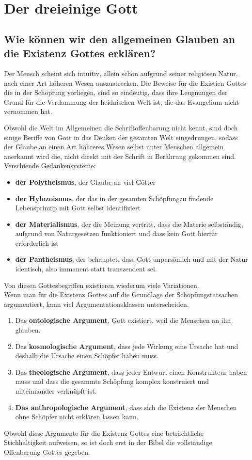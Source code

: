 \section{Der dreieinige Gott}
\subsection{Wie können wir den allgemeinen Glauben an die Existenz Gottes erklären?}
Der Mensch scheint sich intuitiv, allein schon aufgrund seiner religiösen Natur, nach einer Art höheren Wesen auszustrecken. Die Beweise für die Existien Gottes die in der Schöpfung vorliegen, sind so eindeutig, dass ihre Leugnungen der Grund für die Verdammung der heidnischen Welt ist, die das Evangelium nicht vernommen hat.

Obwohl die Welt im Allgemeinen die Schriftoffenbarung nicht kennt, sind doch einige Beriffe von Gott in das Denken der gesamten Welt eingedrungen, sodass der Glaube an einen Art höhreres Wesen selbst unter Menschen allgemein anerkannt wird die, nicht direkt mit der Schrift in Berährung gekommen sind.\\
Verschiende Gedankensysteme:
\begin{itemize}
	\item \textbf{der Polytheismus}, der Glaube an viel Götter
	\item \textbf{der Hylozoismus}, der das in der gesamten Schöpfungzu findende Lebensprinzip mit Gott selbst identifiziert
	\item \textbf{der Materialismus}, der die Meinung vertritt, dass die Materie selbständig, aufgrund von Naturgesetzen funktioniert und dass kein Gott hierfür erforderlich ist
	\item \textbf{der Pantheismus}, der behauptet, dass Gott unpersönlich und mit der Natur identisch, also immanent statt transzendent sei.
\end{itemize}
Von diesen Gottesbegriffen existieren wiederum viele Variationen.\\
Wenn man für die Existenz Gottes auf die Grundlage der Schöpfungstatsachen argumentiert, kann viel Argumentationsklassen unterscheiden.
\begin{enumerate}
	\item Das \textbf{ontologische Argument}, Gott existiert, weil die Menschen an ihn glauben.
	\item Das \textbf{kosmologische Argument}, dass jede Wirkung eine Ursache hat und deshalb die Ursache einen Schöpfer haben muss.
	\item Das \textbf{theologische Argument}, dass jeder Entwurf einen Konstrukteur haben muss und dass die gesammte Schöpfung komplex konstruiert und miteinnander verknüpft ist.
	\item \textbf{Das anthropologische Argument}, dass sich die Existenz der Menschen ohne Schöpfer nicht erklären lassen kann. 
\end{enumerate}
Obwohl diese Argumente für die Existenz Gottes eine beträchtliche Stichhaltigkeit aufweisen, so ist doch erst in der Bibel die vollständige Offenbarung Gottes gegeben.
